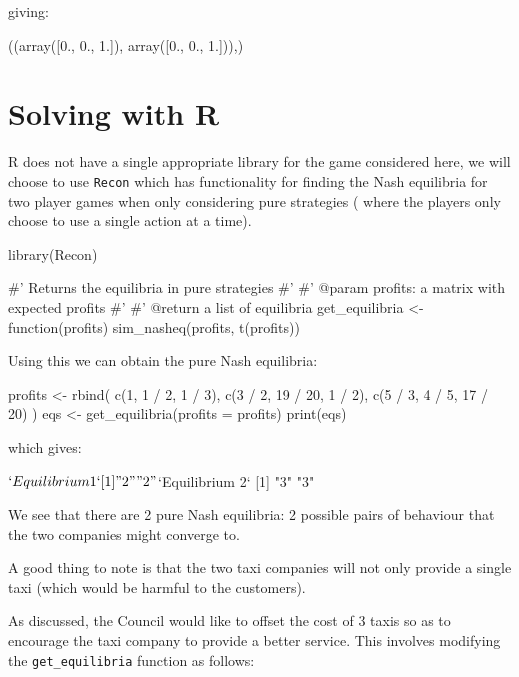 giving:

\begin{pyout}
((array([0., 0., 1.]), array([0., 0., 1.])),)
\end{pyout}

\section{Solving with R}\label{sec:solving-with-R}

R does not have a single appropriate library for the game considered here, we
will choose to use \texttt{Recon} which has functionality for finding the
Nash equilibria for two player games when only considering pure strategies (
where the players only choose to use a single action at a time).

\begin{Rin}
library(Recon)

#' Returns the equilibria in pure strategies
#'
#' @param profits: a matrix with expected profits
#'
#' @return a list of equilibria
get_equilibria <- function(profits){
    sim_nasheq(profits, t(profits))
}
\end{Rin}

Using this we can obtain the pure Nash equilibria:

\begin{Rin}

profits <- rbind(
        c(1, 1 / 2, 1 / 3),
        c(3 / 2, 19 / 20, 1 / 2),
        c(5 / 3, 4 / 5, 17 / 20)
    )
eqs <- get_equilibria(profits = profits)
print(eqs)
\end{Rin}

which gives:

\begin{Rout}
$`Equilibrium 1`
[1] "2" "2"

$`Equilibrium 2`
[1] "3" "3"

\end{Rout}

We see that there are 2 pure Nash equilibria: 2 possible pairs of behaviour that the
two companies might converge to.

A good thing to note is that the two taxi
companies will not only provide a single taxi (which would be harmful to the
customers).

As discussed, the Council would like to offset the cost of 3
taxis so as to encourage the taxi company to provide a better service. This
involves modifying the \texttt{get_equilibria} function as follows:


